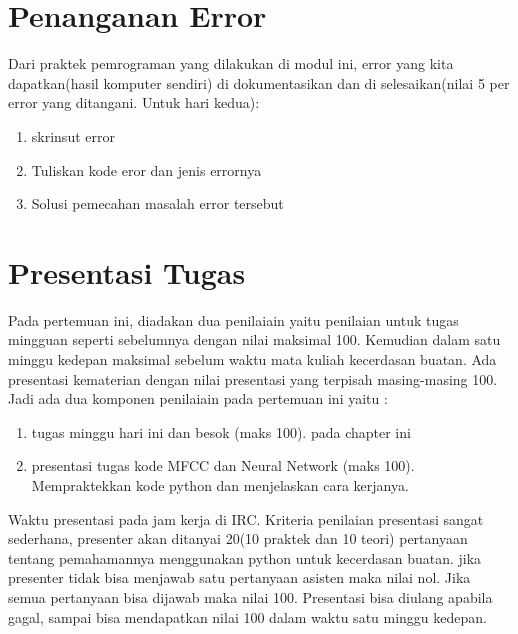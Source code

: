 \section{Penanganan Error}
Dari praktek pemrograman yang dilakukan di modul ini, error yang kita dapatkan(hasil komputer sendiri) di dokumentasikan dan di selesaikan(nilai 5 per error yang ditangani. Untuk hari kedua):

\begin{enumerate}
	\item skrinsut error
	\item Tuliskan kode eror dan jenis errornya
	\item Solusi pemecahan masalah error tersebut
\end{enumerate}

\section{Presentasi Tugas}
Pada pertemuan ini, diadakan dua penilaiain yaitu penilaian untuk tugas mingguan seperti sebelumnya dengan nilai maksimal 100. Kemudian dalam satu minggu kedepan maksimal sebelum waktu mata kuliah kecerdasan buatan. Ada presentasi kematerian dengan nilai presentasi yang terpisah masing-masing 100. Jadi ada dua komponen penilaiain pada pertemuan ini yaitu :
\begin{enumerate}
	\item tugas minggu hari ini dan besok (maks 100). pada chapter ini
	\item presentasi tugas kode MFCC dan Neural Network (maks 100). Mempraktekkan kode python dan menjelaskan cara kerjanya.
\end{enumerate}
Waktu presentasi pada jam kerja di IRC. Kriteria penilaian presentasi sangat sederhana, presenter akan ditanyai 20(10 praktek dan 10 teori) pertanyaan tentang pemahamannya menggunakan python untuk kecerdasan buatan. jika presenter tidak bisa menjawab satu pertanyaan asisten maka nilai nol. Jika semua pertanyaan bisa dijawab maka nilai 100. Presentasi bisa diulang apabila gagal, sampai bisa mendapatkan nilai 100 dalam waktu satu minggu kedepan.


